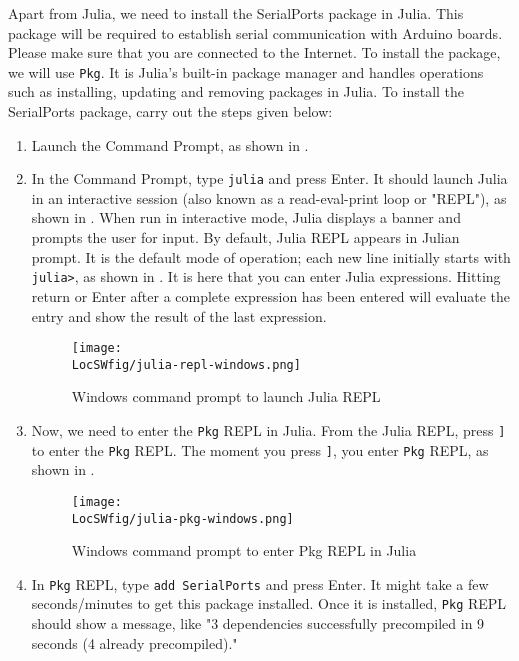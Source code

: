 Apart from Julia, we need to install the SerialPorts \cite{julia-serial-ports} package in Julia. This package will be
required to establish serial communication with Arduino boards. Please make sure that
you are connected to the Internet. To install the package, we will use {\tt Pkg}.
It is Julia's built-in package manager and handles operations such as installing,
updating and removing packages in Julia. To install the SerialPorts package, carry out the steps given below:
\begin{enumerate}
      \item Launch the Command Prompt, as shown in .
      \item In the Command Prompt, type {\tt julia} and press Enter. It should launch Julia in an interactive session (also known as a read-eval-print loop or "REPL"), as shown
            in . When run in interactive mode, Julia displays a banner and
            prompts the user for input. By default, Julia REPL appears in Julian prompt. It is the default mode of
            operation; each new line initially starts with {\tt julia>}, as
            shown in . It is here that you can enter Julia expressions.
            Hitting return or Enter after a complete expression has been entered will evaluate
            the entry and show the result of the last expression.
            \begin{figure}
                  \centering
                  \texttt{[image: \\LocSWfig/julia-repl-windows.png]}
                  \caption{Windows command prompt to launch Julia REPL}
                  \label{julia-repl-windows}
            \end{figure}
      \item Now, we need to enter the {\tt Pkg} REPL in Julia. From the Julia REPL,
            press {\tt ]} to enter the {\tt Pkg} REPL. The moment you press
                  {\tt ]}, you enter {\tt Pkg} REPL, as shown in .
            \begin{figure}
                  \centering
                  \texttt{[image: \\LocSWfig/julia-pkg-windows.png]}
                  \caption{Windows command prompt to enter Pkg REPL in Julia}
                  \label{julia-pkg-windows}
            \end{figure}
      \item In {\tt Pkg} REPL, type {\tt add SerialPorts} and press Enter. It might take a few seconds/minutes
            to get this package installed. Once it is installed, {\tt Pkg} REPL should show a message,
            like "3 dependencies successfully precompiled in 9 seconds (4 already precompiled)."
\end{enumerate}

